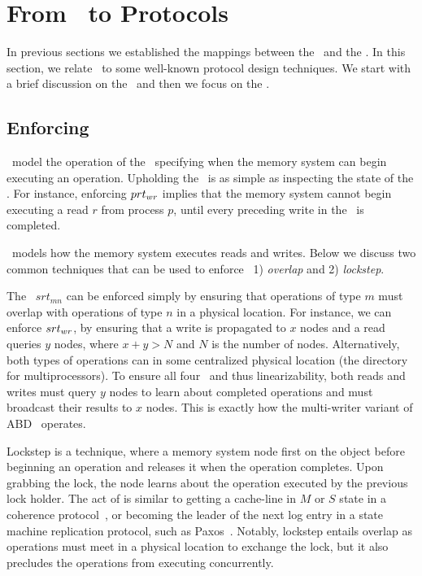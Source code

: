 \section{From \rts\ to Protocols} \label{sec:prot}

In previous sections we established the mappings between the \synpats\ and the \rts. 
In this section, we relate \rts\ to some well-known protocol design techniques. %
We start with a brief discussion on the \prts\ and then we focus on the \srts.






\subsection{Enforcing \rts}
\Prts\ model the operation of the \rob\ specifying  when the memory system can begin executing an operation.
Upholding the \prts\ is as simple as inspecting the state of the \rob.
For instance, enforcing $prt_{wr}$ implies that the memory system cannot begin executing a read $r$ from process $p$, until every preceding write in the \rob\ is completed.



\custvspace
\Srts\ models how the memory system executes reads and writes.
Below we discuss two common techniques that can be used to enforce \srts\ 1) \emph{overlap} and 2) \emph{lockstep}.

The \srt\ $srt_{mn}$ can be enforced simply by ensuring that operations of type $m$ must overlap with operations of type $n$ in a physical location. For instance, we can enforce $srt_{wr}$, by ensuring that a write is propagated to $x$ nodes and a read queries $y$ nodes, where $x+y > N$ and $N$ is the number of nodes. 
Alternatively, both types of operations can  in some centralized physical location (\eg the directory for multiprocessors). 
To ensure all four \srts\ and thus linearizability, both reads and writes must query $y$ nodes to learn about completed operations and must broadcast their results to $x$ nodes. This is exactly how the multi-writer variant of ABD~\cite{Lynch:1997} operates.

Lockstep is %
a technique, %
where a memory system node first  on the object before beginning an operation and releases it when the operation completes. 
Upon grabbing the lock, the node learns about the operation executed by the previous lock holder.
The act of  is similar to getting a cache-line in $M$ or $S$ state in a coherence protocol~\cite{Vijay:2020}, or becoming the leader of the next log entry in a state machine replication protocol, such as Paxos~\cite{Lamport:1998}. Notably, lockstep entails overlap as operations must meet in a physical location to exchange the lock, but it also precludes the operations from executing concurrently.

